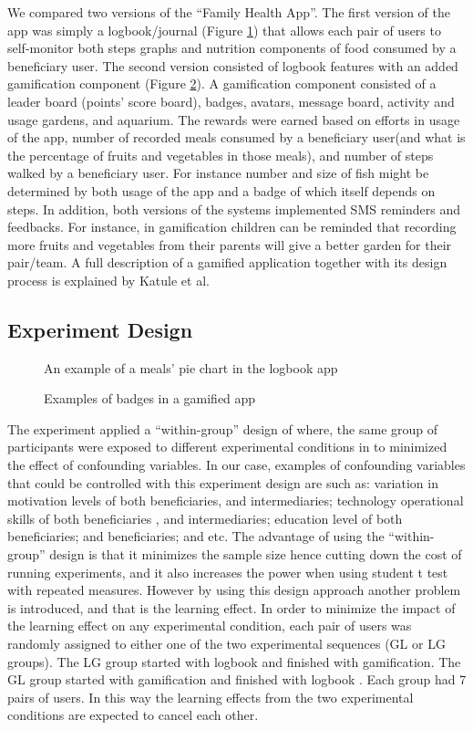 \documentclass{sig-alternate}
\begin{document}
We compared two versions of the ``Family Health App''. The first version of the app was simply a logbook/journal (Figure \ref{figure:logbookapp}) that allows each pair of users to self-monitor both steps graphs and nutrition components of food consumed by a beneficiary user. The second version consisted of logbook features with an added gamification component (Figure \ref{figure:gameapp}). A gamification component consisted of a leader board (points' score board), badges, avatars, message board, activity and usage gardens, and aquarium. The rewards were earned based on efforts in usage of the app, number of recorded meals consumed by a beneficiary user(and what is the percentage of fruits and vegetables in those meals), and number of steps walked by a beneficiary user. For instance  number and size of fish might be determined by both usage of the app and a badge of which itself depends on steps.  In addition, both versions of the systems implemented SMS reminders and feedbacks. For instance, in gamification children can be reminded that recording more fruits and vegetables from their parents will give a better garden for their pair/team. A full description of a gamified application together with its design process is explained by Katule et al.~\cite{katule2016:leveraging} \newline 
\subsection{Experiment Design}
\begin{figure}
\centering
{}
\caption{An example of a meals' pie chart in the logbook app}
\label{figure:logbookapp}
\end{figure}
\begin{figure}
\centering
{}
\caption{Examples of badges in a gamified app}
\label{figure:gameapp}
\end{figure}   
The experiment applied a ``within-group'' design of where, the same group of participants were exposed to different experimental conditions in to minimized the effect of confounding variables. In our case, examples of confounding variables that could be controlled with this experiment design are such as: variation in motivation levels of both beneficiaries, and intermediaries; technology operational skills of both beneficiaries , and intermediaries; education level of both beneficiaries; and beneficiaries; and etc. The advantage of using the ``within-group'' design is that it minimizes the sample size hence cutting down the cost of running experiments, and it also increases the power when using student t test with repeated measures. However by using this design approach another problem is introduced, and that is the learning effect. In order to minimize the impact of the learning effect on any experimental condition, each pair of users was randomly assigned to either one of the two experimental sequences (GL or LG groups). The LG group started with logbook and finished with gamification. The  GL group started with gamification and finished with logbook . Each group had 7 pairs of users. In this way the learning effects from the two experimental conditions are expected to cancel each other.  
\end{document}
